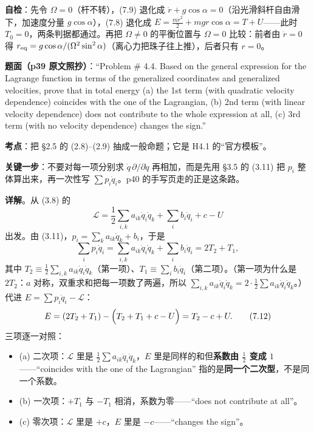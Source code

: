 \documentclass[11pt]{ctexart}
\begin{document}
\textbf{自检}：先令 $\Omega=0$（杆不转），(7.9) 退化成 $\ddot r+g\cos\alpha=0$（沿光滑斜杆自由滑下，加速度分量 $g\cos\alpha$），(7.8) 退化成 $E=\frac{m\dot r^2}{2}+mgr\cos\alpha=T+U$——此时 $T_0=0$，两条判据都通过。再把 $\Omega\ne0$ 的平衡位置与 $\Omega=0$ 比较：前者由 $\ddot r=0$ 得 $r_{\rm eq}=g\cos\alpha/(\Omega^2\sin^2\alpha)$（离心力把珠子往上推），后者只有 $r=0$。


\textbf{题面（p39 原文照抄）}：“Problem \# 4.4. Based on the general expression for the Lagrange function in terms of the generalized coordinates and generalized velocities, prove that in total energy (a) the 1st term (with quadratic velocity dependence) coincides with the one of the Lagrangian, (b) 2nd term (with linear velocity dependence) does not contribute to the whole expression at all, (c) 3rd term (with no velocity dependence) changes the sign.”

\textbf{考点}：把 §2.5 的 (2.8)--(2.9) 抽成一般命题；它是 H4.1 的“官方模板”。

\textbf{关键一步}：不要对每一项分别求 $\dot q\,\partial/\partial\dot q$ 再相加，而是先用 §3.5 的 (3.11) 把 $p_i$ 整体算出来，再一次性写 $\sum p_i\dot q_i$。p40 的手写页走的正是这条路。

\textbf{详解}。从 (3.8) 的
\[
\mathcal{L}=\frac12\sum_{i,k}a_{ik}\dot q_i\dot q_k+\sum_ib_i\dot q_i+c-U
\]
出发。由 (3.11)，$p_i=\sum_ka_{ik}\dot q_k+b_i$，于是
\[
\sum_ip_i\dot q_i=\sum_{i,k}a_{ik}\dot q_i\dot q_k+\sum_ib_i\dot q_i=2T_2+T_1 , \tag{7.11}
\]
其中 $T_2\equiv\frac12\sum_{i,k}a_{ik}\dot q_i\dot q_k$（第一项）、$T_1\equiv\sum_ib_i\dot q_i$（第二项）。（第一项为什么是 $2T_2$：$a$ 对称，双重求和把每一项数了两遍，所以 $\sum_{i,k}a_{ik}\dot q_i\dot q_k=2\cdot\frac12\sum a_{ik}\dot q_i\dot q_k$。）代进 $E=\sum p_i\dot q_i-\mathcal{L}$：
\[
E=(2T_2+T_1)-\Bigl(T_2+T_1+c-U\Bigr)=T_2-c+U . \tag{7.12}
\]
三项逐一对照：
\begin{itemize}
\item (a) 二次项：$\mathcal{L}$ 里是 $\frac12\sum a_{ik}\dot q_i\dot q_k$，$E$ 里是同样的和但\textbf{系数由 $\frac12$ 变成 $1$}——“coincides with the one of the Lagrangian” 指的是\textbf{同一个二次型}，不是同一个系数。
\item (b) 一次项：$+T_1$ 与 $-T_1$ 相消，系数为零——“does not contribute at all”。
\item (c) 零次项：$\mathcal{L}$ 里是 $+c$，$E$ 里是 $-c$——“changes the sign”。
\end{itemize}
\end{document}
